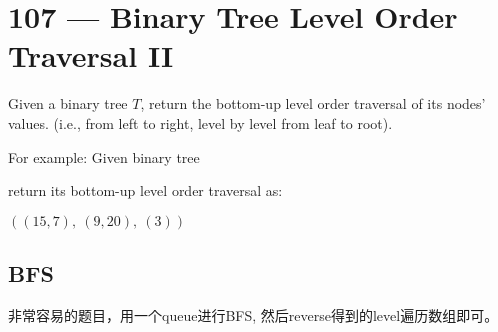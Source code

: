 \section{107 --- Binary Tree Level Order Traversal II}
Given a binary tree $T$, return the bottom-up level order traversal of its nodes' values. (i.e., from left to right, level by level from leaf to root).
\par
For example: Given binary tree
\begin{figure}[H]
\end{figure}
return its bottom-up level order traversal as:
\par
$\left((15,7),\ (9,20),\ (3)\right)$
\subsection{BFS}
\begin{CJK*}{UTF8}{gbsn}
非常容易的题目，用一个queue进行BFS, 然后reverse得到的level遍历数组即可。
\end{CJK*}